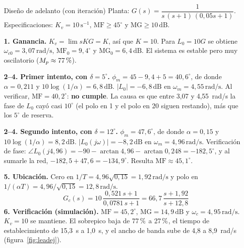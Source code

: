 \documentclass[11pt,a4paper]{article}
\newcounter{ejemplo}
\newenvironment{ejemplo}[1]{\refstepcounter{ejemplo}\begin{ejemplobox}{#1}}{\end{ejemplobox}}
\newcommand{\pct}{\ensuremath{\,\mathchar"7025}}
\newcommand{\dB}{\,\mathrm{dB}}
\newcommand{\rads}{\,\mathrm{rad/s}}
\newcommand{\jw}{j\omega}
\newcommand{\MF}{\mathrm{MF}}
\newcommand{\MG}{\mathrm{MG}}
\newcommand{\wc}{\omega_c}
\begin{document}
\begin{ejemplo}{Diseño de adelanto (con iteración)}
\label{ej:lead}
Planta: $G(s)=\dfrac{1}{s\,(s+1)\,(0{,}05s+1)}$. Especificaciones: $K_v=10\,\mathrm{s^{-1}}$, $\MF\ge45^\circ$ y $\MG\ge10\dB$.

\textbf{1. Ganancia.} $K_v=\lim sKG=K$, así que $K=10$. Para $L_0=10G$ se obtiene $\omega_{c0}=3{,}07\rads$,
$\MF_0=9{,}4^\circ$ y $\MG_0=6{,}4\dB$. El sistema es estable pero muy oscilatorio ($M_p\approx77\pct{}$).

\textbf{2--4. Primer intento, con $\delta=5^\circ$.} $\phi_m=45-9{,}4+5=40{,}6^\circ$, de donde $\alpha=0{,}211$ y $10\log(1/\alpha)=6{,}8\dB$.
$|L_0|=-6{,}8\dB$ en $\omega_m=4{,}55\rads$. Al verificar, $\MF=40{,}2^\circ$: \textbf{no cumple}.
La causa es que entre 3,07 y 4,55~rad/s la fase de $L_0$ cayó casi $10^\circ$ (el polo en 1 y el polo en 20 siguen restando),
más que los $5^\circ$ de reserva.

\textbf{2--4. Segundo intento, con $\delta=12^\circ$.} $\phi_m=47{,}6^\circ$, de donde $\alpha=0{,}15$ y $10\log(1/\alpha)=8{,}2\dB$.
$|L_0(\jw)|=-8{,}2\dB$ en $\omega_m=4{,}96\rads$. Verificación de fase: $\angle L_0(j4{,}96)=-90-\arctan4{,}96-\arctan0{,}248=-182{,}5^\circ$,
y al sumarle la red, $-182{,}5+47{,}6=-134{,}9^\circ$. Resulta $\MF\approx45{,}1^\circ$. \checkmark

\textbf{5. Ubicación.} Cero en $1/T=4{,}96\sqrt{0{,}15}=1{,}92\rads$ y polo en $1/(\alpha T)=4{,}96/\sqrt{0{,}15}=12{,}8\rads$.
\[
\boxed{G_c(s)=10\,\frac{0{,}521\,s+1}{0{,}0781\,s+1}=66{,}7\,\frac{s+1{,}92}{s+12{,}8}}
\]
\textbf{6. Verificación (simulación).} $\MF=45{,}2^\circ$, $\MG=14{,}9\dB$ y $\wc=4{,}95\rads$. $K_v=10$ se mantiene. El sobrepico baja de
77\pct{} a 27\pct{}, el tiempo de establecimiento de 15,3~s a 1,0~s, y el ancho de banda sube de 4,8 a 8,9~rad/s
(figura~\ref{fig:leadej}).
\end{ejemplo}
\end{document}
